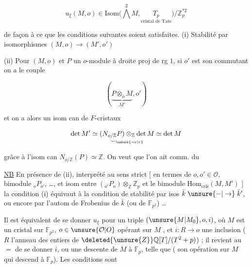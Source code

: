 \[
u_\xi(M,o)\in\mathrm{Isom}\bigl(\bigwedge^2 M,\underset{\text{cristal de Tate}}{T_p}\bigr)/\mathbb Z_p^{*2}
\]

de façon à ce que les conditions suivantes soient satisfaites.
(i) Stabilité par isomorphismes $(M,o)\to(M',o')$

(ii) Pour $(M,o)$ et $P$ un $o$-module à droite proj de rg $1$,
si $o'$  est son commutant on a le couple

\[
(\underbrace{P\otimes_o M}_{M'},o')
\]

et on a alors un isom can de $F$-cristaux

\[
\det M'\simeq\underset{\smile_{\unsure{\sim c|c}}}{(N_{o/\mathbb Z}P)\otimes_{\mathbb Z}\det M}\simeq\det M
\]

grâce à l'isom can $N_{o/\mathbb Z}(P)\simeq\mathbb Z$. On veut que l'on ait
comm. du


\uline{NB} En présence de (ii),  interprété au sens strict
$[$ en termes de $o,o'\in\mathcal O$, bimodule $ {}_oP_{o'}$, \ldots, et
isom  entre $({}_{o'}P_o)\otimes_{\mathbb Z}\mathbb Z_p$ et le bimodule $\mathrm{Hom}_{\mathrm{cris}}(M,M')$ $]$
la condition (i) équivaut à la condition de stabilité
par isos $\bar k\mathrel{\unsure{-|\to}}\bar k'$, ou encore par l'autom de
Frobenius de $\bar k$ (ou de $\mathbb F_{p^2}$) \ldots


Il est équivalent de se donner  $u_\xi$ pour un triple
$(\unsure{M|M_0},o,i)$, où  $M$ est un cristal  sur $\mathbb F_{p^2}$,
$o\in\unsure{\mathcal O|O}$  opérant sur $M$ , et $i:R\to o$ une
inclusion ($R$ l'anneau des entiers de $\deleted{\unsure{Z}}\mathbb Q[T]/(T^2+p)$) ;
il revient au $=$ de se donner $i$, ou une descente  de $M$ à $\mathbb F_p$, telle que
  ( son opération sur
$M$ qui descend à $\mathbb F_p$). Les conditions sont

